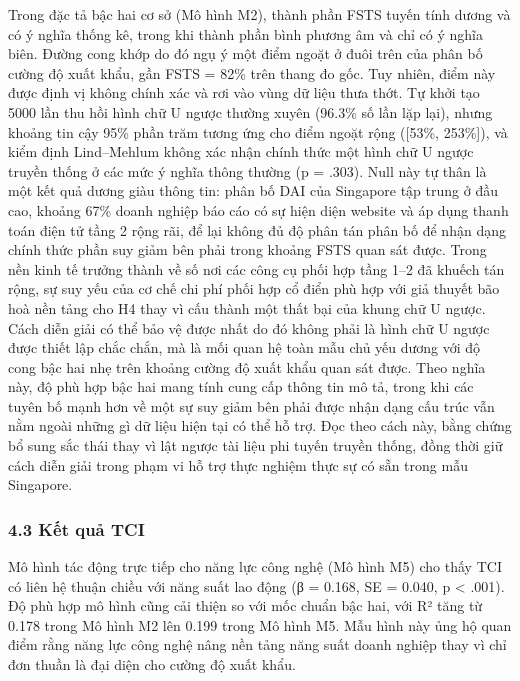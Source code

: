 \documentclass[12pt,a4paper]{article}
\begin{document}
Trong đặc tả bậc hai cơ sở (Mô hình M2), thành phần FSTS tuyến tính
dương và có ý nghĩa thống kê, trong khi thành phần bình phương âm và chỉ
có ý nghĩa biên. Đường cong khớp do đó ngụ ý một điểm ngoặt ở đuôi trên
của phân bố cường độ xuất khẩu, gần FSTS = 82\% trên thang đo gốc. Tuy
nhiên, điểm này được định vị không chính xác và rơi vào vùng dữ liệu
thưa thớt. Tự khởi tạo 5000 lần thu hồi hình chữ U ngược thường xuyên
(96.3\% số lần lặp lại), nhưng khoảng tin cậy 95\% phần trăm tương ứng
cho điểm ngoặt rộng ({[}53\%, 253\%{]}), và kiểm định Lind--Mehlum không
xác nhận chính thức một hình chữ U ngược truyền thống ở các mức ý nghĩa
thông thường (p = .303). Null này tự thân là một kết quả dương giàu
thông tin: phân bố DAI của Singapore tập trung ở đầu cao, khoảng 67\%
doanh nghiệp báo cáo có sự hiện diện website và áp dụng thanh toán điện
tử tầng 2 rộng rãi, để lại không đủ độ phân tán phân bố để nhận dạng
chính thức phần suy giảm bên phải trong khoảng FSTS quan sát được. Trong
nền kinh tế trưởng thành về số nơi các công cụ phối hợp tầng 1--2 đã
khuếch tán rộng, sự suy yếu của cơ chế chi phí phối hợp cổ điển phù hợp
với giả thuyết bão hoà nền tảng cho H4 thay vì cấu thành một thất bại
của khung chữ U ngược. Cách diễn giải có thể bảo vệ được nhất do đó
không phải là hình chữ U ngược được thiết lập chắc chắn, mà là mối quan
hệ toàn mẫu chủ yếu dương với độ cong bậc hai nhẹ trên khoảng cường độ
xuất khẩu quan sát được. Theo nghĩa này, độ phù hợp bậc hai mang tính
cung cấp thông tin mô tả, trong khi các tuyên bố mạnh hơn về một sự suy
giảm bên phải được nhận dạng cấu trúc vẫn nằm ngoài những gì dữ liệu
hiện tại có thể hỗ trợ. Đọc theo cách này, bằng chứng bổ sung sắc thái
thay vì lật ngược tài liệu phi tuyến truyền thống, đồng thời giữ cách
diễn giải trong phạm vi hỗ trợ thực nghiệm thực sự có sẵn trong mẫu
Singapore.

\hypertarget{43-kux1ebft-quux1ea3-tci}{%
\subsubsection{4.3 Kết quả TCI}\label{43-kux1ebft-quux1ea3-tci}}

Mô hình tác động trực tiếp cho năng lực công nghệ (Mô hình M5) cho thấy
TCI có liên hệ thuận chiều với năng suất lao động (β = 0.168, SE =
0.040, p \textless{} .001). Độ phù hợp mô hình cũng cải thiện so với mốc
chuẩn bậc hai, với R² tăng từ 0.178 trong Mô hình M2 lên 0.199 trong Mô
hình M5. Mẫu hình này ủng hộ quan điểm rằng năng lực công nghệ nâng nền
tảng năng suất doanh nghiệp thay vì chỉ đơn thuần là đại diện cho cường
độ xuất khẩu.
\end{document}

